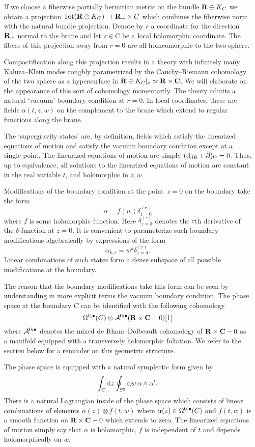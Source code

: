 \documentclass[11pt]{amsart}
\begin{document}
If we choose a fiberwise partially hermitian metric on the bundle $\mathbf{R} \oplus K_C$ we obtain a projection ${\rm Tot}(\mathbf{R} \oplus K_C) \to \mathbf{R}_+ \times C$ which combines the fiberwise norm with the natural bundle projection.
Denote by $r$ a coordinate for the direction $\mathbf{R}_+$ normal to the brane and let $z \in C$ be a local holomorphic coordinate.
The fibers of this projection away from $r = 0$ are all homeomorphic to the two-sphere.

Compactification along this projection results in a theory with infinitely many Kaluza--Klein modes roughly parametrized by the Cauchy--Riemann cohomology of the two sphere as a hypersurface in $\mathbf{R} \oplus K_C|_z \simeq \mathbf{R} \times \mathbf{C}$.
We will elaborate on the appearance of this sort of cohomology momentarily.
The theory admits a natural `vacuum' boundary condition at $r=0$.
In local coordinates, these are fields $\alpha(t,z,w)$ on the complement to the brane which extend to regular functions along the brane.

The `supergravity states' are, by definition, fields which satisfy the linearized equations of motion and satisfy the vacuum boundary condition except at a single point.
The linearized equations of motion are simply $({\rm d}_{dR} + \overline{\partial}) \alpha = 0$.
Thus, up to equivalence, all solutions to the linearized equations of motion are constant in the real variable $t$, and holomorphic in $z,w$.

Modifications of the boundary condition at the point~$z = 0$ on the boundary take the form
\[
\alpha = f(w) \delta^{(r)}_{z=0}
\]
where $f$ is some holomorphic function.
Here $\delta^{(r)}_{z=0}$ denotes the $r$th derivative of the $\delta$-function at $z=0$.
It is convenient to parameterize such boundary modifications algebraically by expressions of the form
\[
\alpha_{k,r} = w^k \delta^{(r)}_{z=0} .
\]
Linear combinations of such states form a dense subspace of all possible modifications at the boundary.

The reason that the boundary modifications take this form can be seen by understanding in more explicit terms the vacuum boundary condition.
The phase space at the boundary $C$ can be identified with the following cohomology
\[
\Omega^{0,\bullet}(C) \otimes \mathcal A^{0;\bullet}(\mathbf{R} \times \mathbf{C} - 0) [1]
\]
where $\mathcal A^{0;\bullet}$ denotes the mixed de Rham--Dolbeault cohomology of $\mathbf{R} \times \mathbf{C} - 0$ as a manifold equipped with a transversely holomorphic foliation.
We refer to the section below for a reminder on this geometric structure.

The phase space is equipped with a natural symplectic form given by
\[
\int_C {\rm d} z \oint_{S^2} {\rm d} w \, \alpha \wedge \alpha' .
\]
There is a natural Lagrangian inside of the phase space which consists of linear combinations of elements $\alpha(z) \otimes f(t,w)$ where $\alpha(z) \in \Omega^{0,\bullet}(C)$ and $f(t,w)$ is a smooth function on $\mathbf{R} \times \mathbf{C} - 0$ which extends to zero.
The linearized equations of motion simply say that $\alpha$ is holomorphic, $f$ is independent of $t$ and depends holomorphically on $w$.
\end{document}
